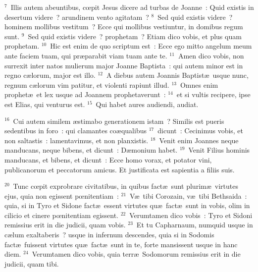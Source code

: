 ${}^{7}$~Illis autem abeuntibus, cœpit Jesus dicere ad turbas de Joanne~: Quid existis in desertum videre~? arundinem vento agitatam~?
${}^{8}$~Sed quid existis videre~? hominem mollibus vestitum~? Ecce qui mollibus vestiuntur, in domibus regum sunt.
${}^{9}$~Sed quid existis videre~? prophetam~? Etiam dico vobis, et plus quam prophetam.
${}^{10}$~Hic est enim de quo scriptum est~: Ecce ego mitto angelum meum ante faciem tuam, qui pr\ae parabit viam tuam ante te.
${}^{11}$~Amen dico vobis, non surrexit inter natos mulierum major Joanne Baptista~: qui autem minor est in regno c\ae lorum, major est illo.
${}^{12}$~A diebus autem Joannis Baptist\ae\ usque nunc, regnum c\ae lorum vim patitur, et violenti rapiunt illud.
${}^{13}$~Omnes enim prophet\ae\ et lex usque ad Joannem prophetaverunt~:
${}^{14}$~et si vultis recipere, ipse est Elias, qui venturus est.
${}^{15}$~Qui habet aures audiendi, audiat.


${}^{16}$~Cui autem similem \ae stimabo generationem istam~? Similis est pueris sedentibus in foro~: qui clamantes co\ae qualibus
${}^{17}$~dicunt~: Cecinimus vobis, et non saltastis~: lamentavimus, et non planxistis.
${}^{18}$~Venit enim Joannes neque manducans, neque bibens, et dicunt~: D\ae monium habet.
${}^{19}$~Venit Filius hominis manducans, et bibens, et dicunt~: Ecce homo vorax, et potator vini, publicanorum et peccatorum amicus. Et justificata est sapientia a filiis suis.


${}^{20}$~Tunc cœpit exprobrare civitatibus, in quibus fact\ae\ sunt plurim\ae\ virtutes ejus, quia non egissent pœnitentiam~:
${}^{21}$~V\ae\ tibi Corozain, v\ae\ tibi Bethsaida~: quia, si in Tyro et Sidone fact\ae\ essent virtutes qu\ae\ fact\ae\ sunt in vobis, olim in cilicio et cinere pœnitentiam egissent.
${}^{22}$~Verumtamen dico vobis~: Tyro et Sidoni remissius erit in die judicii, quam vobis.
${}^{23}$~Et tu Capharnaum, numquid usque in c\ae lum exaltaberis~? usque in infernum descendes, quia si in Sodomis fact\ae\ fuissent virtutes qu\ae\ fact\ae\ sunt in te, forte mansissent usque in hanc diem.
${}^{24}$~Verumtamen dico vobis, quia terr\ae\ Sodomorum remissius erit in die judicii, quam tibi.


